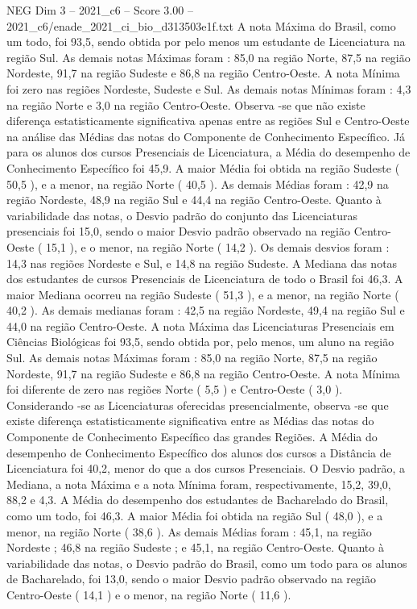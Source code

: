\begin{textsample}{NEG Dim 3 – 2021\_c6 – Score 3.00 – 2021\_c6/enade\_2021\_ci\_bio\_d313503e1f.txt}
A nota Máxima do Brasil, como um todo, foi 93,5, sendo obtida por pelo menos um estudante de Licenciatura na região Sul.
As demais notas Máximas foram : 85,0 na região Norte, 87,5 na região Nordeste, 91,7 na região Sudeste e 86,8 na região Centro-Oeste.
A nota Mínima foi zero nas regiões Nordeste, Sudeste e Sul.
As demais notas Mínimas foram : 4,3 na região Norte e 3,0 na região Centro-Oeste.
Observa -se que não existe diferença estatisticamente significativa apenas entre as regiões Sul e Centro-Oeste na análise das Médias das notas do Componente de Conhecimento Específico.
Já para os alunos dos cursos Presenciais de Licenciatura, a Média do desempenho de Conhecimento Específico foi 45,9.
A maior Média foi obtida na região Sudeste ( 50,5 ), e a menor, na região Norte ( 40,5 ).
As demais Médias foram : 42,9 na região Nordeste, 48,9 na região Sul e 44,4 na região Centro-Oeste.
Quanto à variabilidade das notas, o Desvio padrão do conjunto das Licenciaturas presenciais foi 15,0, sendo o maior Desvio padrão observado na região Centro-Oeste ( 15,1 ), e o menor, na região Norte ( 14,2 ).
Os demais desvios foram : 14,3 nas regiões Nordeste e Sul, e 14,8 na região Sudeste.
A Mediana das notas dos estudantes de cursos Presenciais de Licenciatura de todo o Brasil foi 46,3.
A maior Mediana ocorreu na região Sudeste ( 51,3 ), e a menor, na região Norte ( 40,2 ).
As demais medianas foram : 42,5 na região Nordeste, 49,4 na região Sul e 44,0 na região Centro-Oeste.
A nota Máxima das Licenciaturas Presenciais em Ciências Biológicas foi 93,5, sendo obtida por, pelo menos, um aluno na região Sul.
As demais notas Máximas foram : 85,0 na região Norte, 87,5 na região Nordeste, 91,7 na região Sudeste e 86,8 na região Centro-Oeste.
A nota Mínima foi diferente de zero nas regiões Norte ( 5,5 ) e Centro-Oeste ( 3,0 ).
Considerando -se as Licenciaturas oferecidas presencialmente, observa -se que existe diferença estatisticamente significativa entre as Médias das notas do Componente de Conhecimento Específico das grandes Regiões.
A Média do desempenho de Conhecimento Específico dos alunos dos cursos a Distância de Licenciatura foi 40,2, menor do que a dos cursos Presenciais.
O Desvio padrão, a Mediana, a nota Máxima e a nota Mínima foram, respectivamente, 15,2, 39,0, 88,2 e 4,3.
A Média do desempenho dos estudantes de Bacharelado do Brasil, como um todo, foi 46,3.
A maior Média foi obtida na região Sul ( 48,0 ), e a menor, na região Norte ( 38,6 ).
As demais Médias foram : 45,1, na região Nordeste ; 46,8 na região Sudeste ; e 45,1, na região Centro-Oeste.
Quanto à variabilidade das notas, o Desvio padrão do Brasil, como um todo para os alunos de Bacharelado, foi 13,0, sendo o maior Desvio padrão observado na região Centro-Oeste ( 14,1 ) e o menor, na região Norte ( 11,6 ).

\end{textsample}
